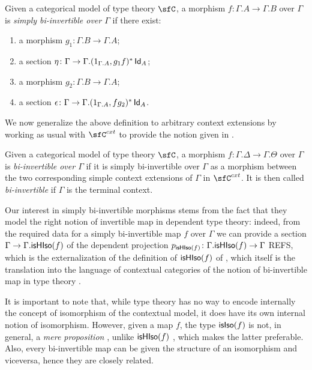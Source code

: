 \begin{defn}
  Given a categorical model of type theory $\sfC$, a morphism
  $f\colon\Gamma.A\rightarrow\Gamma.B$ over $\Gamma$ is \emph{simply
    bi-invertible over $\Gamma$} if there exist:
  \begin{enumerate}
    \item a morphism $g_1\colon\Gamma.B\rightarrow\Gamma.A$;
    \item a section
      $\eta\colon\Gamma\rightarrow\Gamma.(1_{\Gamma.A},g_1f)^*\operatorname{\mathsf{Id}}_{A}$;
    \item a morphism $g_2\colon\Gamma.B\rightarrow\Gamma.A$;
    \item a section
      $\epsilon\colon\Gamma\rightarrow\Gamma.(1_{\Gamma.A},fg_2)^*\operatorname{\mathsf{Id}}_{A}$.
  \end{enumerate}
\end{defn}

We now generalize the above definition to arbitrary context extensions by
working as usual with $\sfC^{cxt}$ to provide the notion given in
\cite[Def.~1.4]{Kap17}.

\begin{defn}
  Given a categorical model of type theory $\sfC$, a morphism
  $f\colon\Gamma.\Delta\rightarrow\Gamma.\Theta$ over $\Gamma$ is
  \emph{bi-invertible over $\Gamma$} if it is simply bi-invertible over $\Gamma$
  as a morphism between the two corresponding simple context extensions of
  $\Gamma$ in $\sfC^{cxt}$. It
  is then called \emph{bi-invertible} if $\Gamma$ is the terminal
  context.
\end{defn}

\begin{rmk}
  Our interest in simply bi-invertible morphisms stems from the fact that they
  model the right notion of invertible map in dependent type theory: indeed,
  from the
  required data for a simply bi-invertible map $f$ over $\Gamma$ we can provide
  a section $\Gamma\rightarrow\Gamma.\mathsf{isHIso}({f})$ of the dependent projection
  $p_{\mathsf{isHIso}({f})}\colon\Gamma.\mathsf{isHIso}({f})\rightarrow\Gamma$ REFS, which is
  the externalization of the definition of $\mathsf{isHIso}({f})$ of
  \cite[Def.~B.3.3]{KL12}, which itself is the translation into the language of
  contextual categories of the notion of bi-invertible map in type theory
  \cite[Def~4.3.1]{Uni13}.

  It is important to note that, while type theory has no way to encode
  internally the concept of isomorphism of the contextual model, it does have
  its own internal notion of isomorphism. However, given a map $f$, the type
  $\mathsf{isIso}({f})$ is not, in general, a \emph{mere proposition}
  \cite[Def.~3.3.1]{Uni13}, unlike $\mathsf{isHIso}({f})$
  \cite[Thm.~4.3.2]{Uni13}, which makes the latter
  preferable. Also, every bi-invertible map can be given the structure of an
  isomorphism and viceversa, hence they are closely related.
\end{rmk}

